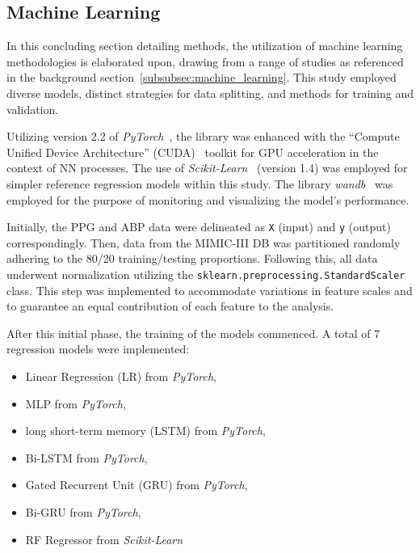 \subsection{Machine Learning}
\label{subsec:ml_methods}

In this concluding section detailing methods, the utilization of machine learning meth\-odologies is elaborated upon,
drawing from a range of studies as referenced in the background section~\ref{subsubsec:machine_learning}.
This study employed diverse models, distinct strategies for data splitting, and methods for training and validation.

Utilizing version 2.2 of \textit{PyTorch}~\cite{PyTorch}, the library was enhanced with the \enquote{Compute Unified Device Architecture} (CUDA)~\cite{CUDAToolkitFree} toolkit for \ac{GPU} acceleration in the context of NN processes.
The use of \textit{Scikit-Learn}~\cite{ScikitlearnMachineLearning} (version 1.4) was employed for simpler reference regression models within this study.
The library \textit{wandb}~\cite{Wandb} was employed for the purpose of monitoring and visualizing the model's performance.

Initially, the PPG and ABP data were delineated as \texttt{X} (input) and \texttt{y} (output) correspondingly.
Then, data from the MIMIC-III DB was partitioned randomly adhering to the 80/20 training/testing proportions.
Following this, all data underwent normalization utilizing the \texttt{sklearn.preprocessing.StandardScaler} class.
This step was implemented to accommodate variations in feature scales and to guarantee an equal contribution of each feature to the analysis.

After this initial phase, the training of the models commenced.
A total of 7 regression models were implemented:
\vspace{-0.2cm}
\begin{itemize}
    \item Linear Regression (\ac{LR}) from \textit{PyTorch},
    \item \ac{MLP} from \textit{PyTorch},
    \item long short-term memory (\ac{LSTM}) from \textit{PyTorch},
    \item \ac{Bi-LSTM} from \textit{PyTorch},
    \item Gated Recurrent Unit (\ac{GRU}) from \textit{PyTorch},
    \item \ac{Bi-GRU} from \textit{PyTorch},
    \item \ac{RF} Regressor from \textit{Scikit-Learn}
\end{itemize}

